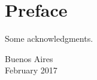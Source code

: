 \chapter{Preface}
\label{cha:preface}

Some acknowledgments.

\begin{flushright}
  \bigskip
  Buenos Aires\\
  February 2017
\end{flushright}
